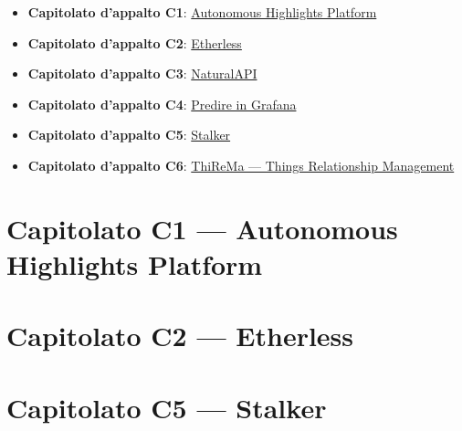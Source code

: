 \documentclass{article}
\begin{document}
\begin{itemize}
  \item \textbf{Capitolato d'appalto C1}: \href{https://www.math.unipd.it/~tullio/IS-1/2019/Progetto/C1.pdf}{Autonomous Highlights Platform}
  \item \textbf{Capitolato d'appalto C2}: \href{https://www.math.unipd.it/~tullio/IS-1/2019/Progetto/C2.pdf}{Etherless}
  \item \textbf{Capitolato d'appalto C3}: \href{https://www.math.unipd.it/~tullio/IS-1/2019/Progetto/C3.pdf}{NaturalAPI}
  \item \textbf{Capitolato d'appalto C4}: \href{https://www.math.unipd.it/~tullio/IS-1/2019/Progetto/C4.pdf}{Predire in Grafana}
  \item \textbf{Capitolato d'appalto C5}: \href{https://www.math.unipd.it/~tullio/IS-1/2019/Progetto/C5.pdf}{Stalker}
  \item \textbf{Capitolato d'appalto C6}: \href{https://www.math.unipd.it/~tullio/IS-1/2019/Progetto/C6.pdf}{ThiReMa --- Things Relationship Management}
\end{itemize}

%

\newpage
\section{Capitolato C1 --- Autonomous Highlights Platform}%
\label{sec:c1}


\newpage
\section{Capitolato C2 --- Etherless}%
\label{sec:c2}


\newpage
\section{Capitolato C5 --- Stalker}%
\label{sec:c5}

\end{document}
